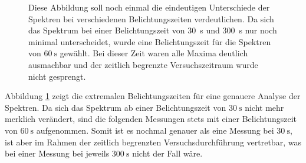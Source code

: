 \begin{figure}[H]
    \centering
    \resizebox{0.8\textwidth}{!}{}   
    \caption[Eindeutige Unterschiede der Spektren bei verschiedenen Belichtungszeiten]{Diese Abbildung soll noch einmal die eindeutigen Unterschiede der Spektren bei verschiedenen Belichtungszeiten verdeutlichen. Da sich das Spektrum bei einer Belichtungszeit von \SI{30}{\second} und \SI{300}{\second} nur noch minimal unterscheidet, wurde eine Belichtungszeit für die Spektren von $\SI{60}{\second}$ gewählt. Bei dieser Zeit waren alle Maxima deutlich ausmachbar und der zeitlich begrenzte Versuchszeitraum wurde nicht gesprengt.}
    \label{fig:BelichtungszeitExtremal}
\end{figure}

Abbildung \ref{fig:BelichtungszeitExtremal} zeigt die extremalen Belichtungszeiten für eine genauere Analyse der Spektren. Da sich das Spektrum ab einer Belichtungszeit von $\SI{30}{\second}$ nicht mehr merklich verändert, sind die folgenden Messungen stets mit einer Belichtungszeit von $\SI{60}{\second}$ aufgenommen. Somit ist es nochmal genauer als eine Messung bei $\SI{30}{\second}$, ist aber im Rahmen der zeitlich begrenzten Versuchsdurchführung vertretbar, was bei einer Messung bei jeweils $\SI{300}{\second}$ nicht der Fall wäre.

